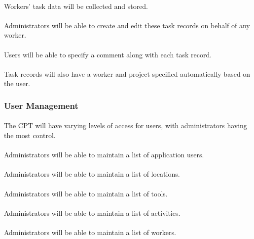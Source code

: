 \documentclass[12pt]{article}
\begin{document}
\paragraph{} Workers' task data will be collected and stored.
\paragraph{} Administrators will be able to create and edit these task records on behalf of any worker.
\paragraph{} Users will be able to specify a comment along with each task record.
\paragraph{} Task records will also have a worker and project specified automatically based on the user.

\subsubsection{User Management}\label{sec:Users}
\paragraph{} The CPT will have varying levels of access for users, with administrators having the most control.
\paragraph{} Administrators will be able to maintain a list of application users.
\paragraph{} Administrators will be able to maintain a list of locations.
\paragraph{} Administrators will be able to maintain a list of tools.
\paragraph{} Administrators will be able to maintain a list of activities.
\paragraph{} Administrators will be able to maintain a list of workers.
\end{document}

